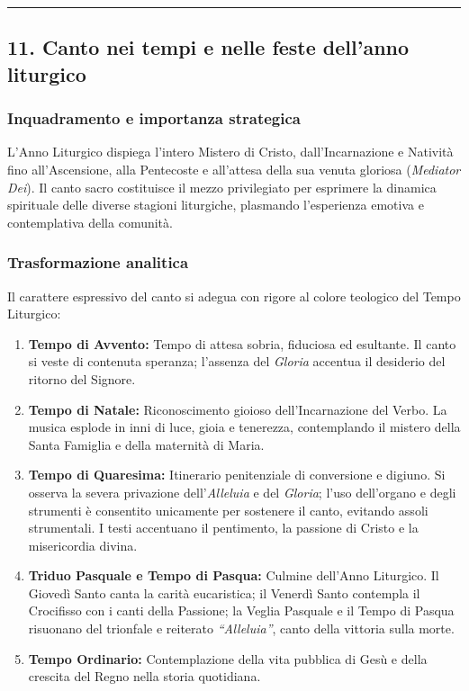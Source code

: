 \documentclass[12pt,a4paper]{article}
\begin{document}
	\begin{center}\rule{0.5\linewidth}{0.5pt}\end{center}
	
	\subsection{11. Canto nei tempi e nelle feste dell'anno liturgico}\label{canto-nei-tempi-e-nelle-feste-dellanno-liturgico}
	
	\subsubsection{Inquadramento e importanza strategica}\label{inquadramento-e-importanza-strategica-9}
	
	L'Anno Liturgico dispiega l'intero Mistero di Cristo, dall'Incarnazione e Natività fino all'Ascensione, alla Pentecoste e all'attesa della sua venuta gloriosa (\emph{Mediator Dei}). Il canto sacro costituisce il mezzo privilegiato per esprimere la dinamica spirituale delle diverse stagioni liturgiche, plasmando l'esperienza emotiva e contemplativa della comunità.
	
	\subsubsection{Trasformazione analitica}\label{trasformazione-analitica-10}
	
	Il carattere espressivo del canto si adegua con rigore al colore teologico del Tempo Liturgico:
	
	\begin{enumerate}[label=\arabic*.,leftmargin=*]
		\item \textbf{Tempo di Avvento:} Tempo di attesa sobria, fiduciosa ed esultante. Il canto si veste di contenuta speranza; l'assenza del \emph{Gloria} accentua il desiderio del ritorno del Signore.
		\item \textbf{Tempo di Natale:} Riconoscimento gioioso dell'Incarnazione del Verbo. La musica esplode in inni di luce, gioia e tenerezza, contemplando il mistero della Santa Famiglia e della maternità di Maria.
		\item \textbf{Tempo di Quaresima:} Itinerario penitenziale di conversione e digiuno. Si osserva la severa privazione dell'\emph{Alleluia} e del \emph{Gloria}; l'uso dell'organo e degli strumenti è consentito unicamente per sostenere il canto, evitando assoli strumentali. I testi accentuano il pentimento, la passione di Cristo e la misericordia divina.
		\item \textbf{Triduo Pasquale e Tempo di Pasqua:} Culmine dell'Anno Liturgico. Il Giovedì Santo canta la carità eucaristica; il Venerdì Santo contempla il Crocifisso con i canti della Passione; la Veglia Pasquale e il Tempo di Pasqua risuonano del trionfale e reiterato \emph{``Alleluia''}, canto della vittoria sulla morte.
		\item \textbf{Tempo Ordinario:} Contemplazione della vita pubblica di Gesù e della crescita del Regno nella storia quotidiana.
	\end{enumerate}
	
\end{document}
